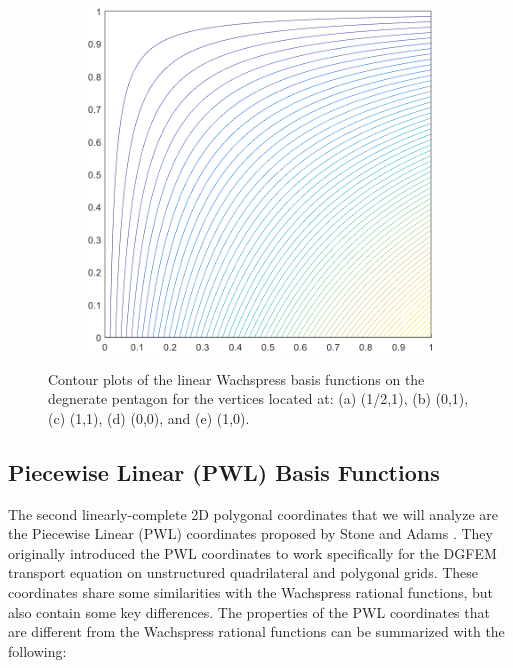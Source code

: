\begin{figure}
\begin{subfigure}[b]{0.39\textwidth}
		\caption{}
	\end{subfigure}
	\hspace{1.5cm}
	\begin{subfigure}[b]{0.39\textwidth}
		\centering
		\includegraphics[width=\textwidth]{figures/sec_BF/deg_square_WACHSPRESS1_contour_b2.png}
		\caption{}
	\end{subfigure}
\caption{Contour plots of the linear Wachspress basis functions on the degnerate pentagon for the vertices located at: (a) (1/2,1), (b) (0,1), (c) (1,1), (d) (0,0), and (e) (1,0).}
\label{fig::2D_WACHSPRESS1_deg_square_basis_functions}
\end{figure}

\subsection{Piecewise Linear (PWL) Basis Functions}
\label{sec::BF_2DLinear_PWL}

The second linearly-complete 2D polygonal coordinates that we will analyze are the Piecewise Linear (PWL) coordinates proposed by Stone and Adams \cite{ref::PWLD_stone_adams,ref::PWLD_stone_adams_unstructured}. They originally introduced the PWL coordinates to work specifically for the DGFEM transport equation on unstructured quadrilateral and polygonal grids. These coordinates share some similarities with the Wachspress rational functions, but also contain some key differences. The properties of the PWL coordinates that are different from the Wachspress rational functions can be summarized with the following:

